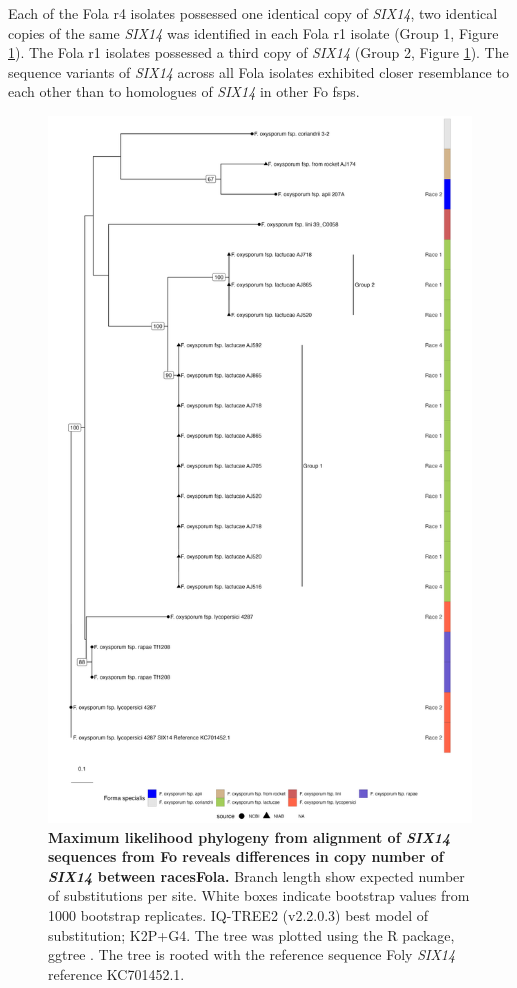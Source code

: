 Each of the \ac{Fola} \ac{r4} isolates possessed one identical copy of \textit{SIX14}, two identical copies of the same \textit{SIX14} was identified in each \ac{Fola} \ac{r1} isolate (Group 1, Figure \ref{fig:lactucae-six14}). The \ac{Fola} \ac{r1} isolates possessed a third copy of \textit{SIX14} (Group 2, Figure \ref{fig:lactucae-six14}). The sequence variants of \textit{SIX14} across all \ac{Fola} isolates exhibited closer resemblance to each other than to homologues of \textit{SIX14} in other \ac{Fo} \acp{fsp}.

\begin{figure}[htp!]
    \centering
    \includegraphics[width=12cm]{Figures/lactucaeSIX14tree.png}
    \captionsetup{width=\textwidth}
    \caption[Maximum likelihood phylogeny from alignment of \textit{SIX14} sequences from \acl{Fo} reveals differences in copy number of \textit{SIX14} between races of \acl{Fola}.]{\textbf{Maximum likelihood phylogeny from alignment of \textit{SIX14} sequences from \acf{Fo} reveals differences in copy number of \textit{SIX14} between races\acf{Fola}.}  Branch length show expected number of substitutions per site. White boxes indicate bootstrap values from 1000 bootstrap replicates. IQ-TREE2 (v2.2.0.3) best model of substitution; K2P+G4. The tree was plotted using the R \parencite{R} package, ggtree \parencite{ggtree}. The tree is rooted with the reference sequence \ac{Foly} \textit{SIX14} reference KC701452.1.}
    \label{fig:lactucae-six14}
\end{figure}

